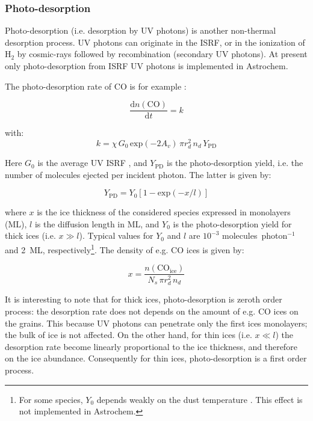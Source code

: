 \documentclass[a4paper,12pt]{article}
\newcommand{\conc}[1]{n(\mathrm{#1})}
\begin{document}
\subsubsection{Photo-desorption}
\label{sec:photo-desorption}

Photo-desorption (i.e. desorption by UV photons) is another
non-thermal desorption process. UV photons can originate in the ISRF,
or in the ionization of H$_{2}$ by cosmic-rays followed by
recombination (secondary UV photons). At present only photo-desorption
from ISRF UV photons is implemented in Astrochem.

The photo-desorption rate of CO is for example
\citep{Oberg09a,Oberg09b}:

\begin{equation}
  \frac{\mathrm{d} \conc{CO}}{\mathrm{d} t} = k
  \label{eq:photo-desorption-rate}
\end{equation}  

with:
\begin{equation}
  k = \chi \, G_{0} \, \mathrm{exp} \left( -2 A_{v} \right)
  \, \pi r_{d}^{2} \, n_{d} \, Y_\mathrm{PD}
  \label{eq:photo-desorption}
\end{equation}

\noindent
Here $G_{0}$ is the average UV ISRF \citep[assumed to be
10$^{8}$~photons~cm$^{-2}$~s$^{-1}$;][]{Habing68}, and $Y_\mathrm{PD}$
is the photo-desorption yield, i.e. the number of molecules ejected
per incident photon. The latter is given by:

\begin{equation}
  Y_\mathrm{PD} = Y_{0} \left[ 1 - \mathrm{exp} \left( -x / l \right) \right]
  \label{eq:photo-desorption-yield}
\end{equation}

\noindent
where $x$ is the ice thickness of the considered species expressed in
monolayers (ML), $l$ is the diffusion length in ML, and $Y_{0}$ is the
photo-desorption yield for thick ices (i.e. $x \gg l$). Typical values
for $Y_{0}$ and $l$ are $10^{-3}$ molecules~photon$^{-1}$ and 2~ML,
respectively\footnote{For some species, $Y_{0}$ depends weakly on the
  dust temperature \citep{Oberg09a}. This effect is not implemented in
  Astrochem.}. The density of e.g. CO ices is given by:

\begin{equation}
  x = \frac{\conc{CO_{ice}}}{N_{s} \, \pi r_{d}^2 \, n_{d}}
  \label{eq:ice-thickness}
\end{equation}

\noindent
It is interesting to note that for thick ices, photo-desorption is
zeroth order process: the desorption rate does not depends on the
amount of e.g. CO ices on the grains. This because UV photons can
penetrate only the first ices monolayers; the bulk of ice is not
affected. On the other hand, for thin ices (i.e. $x \ll l$) the
desorption rate become linearly proportional to the ice thickness, and
therefore on the ice abundance. Consequently for thin ices,
photo-desorption is a first order process.
\end{document}
